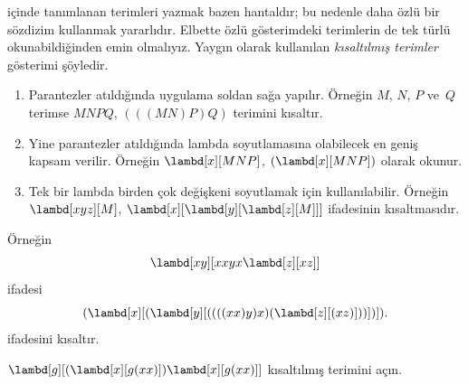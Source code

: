 \documentclass[../../../include/open-logic-section]{subfiles}
\begin{document}

 içinde tanımlanan terimleri yazmak bazen hantaldır;
bu nedenle daha özlü bir sözdizim kullanmak yararlıdır. Elbette özlü
gösterimdeki terimlerin de tek türlü okunabildiğinden emin olmalıyız. Yaygın
olarak kullanılan \emph{kısaltılmış terimler} gösterimi şöyledir.

\begin{enumerate}
\item Parantezler atıldığında uygulama soldan sağa yapılır. Örneğin $M$,
  $N$, $P$ ve~$Q$ terimse $MNPQ$, $(((MN)P)Q)$ terimini kısaltır.
\item Yine parantezler atıldığında lambda soyutlamasına olabilecek en geniş
  kapsam verilir. Örneğin $\lambd[x][MNP]$, $(\lambd[x][MNP])$ olarak
  okunur.
\item Tek bir lambda birden çok değişkeni soyutlamak için kullanılabilir.
  Örneğin $\lambd[xyz][M]$,
  $\lambd[x][\lambd[y][\lambd[z][M]]]$ ifadesinin kısaltmasıdır.
\end{enumerate}

Örneğin
\[
\lambd[xy][xxyx \lambd[z][xz]]
\]
ifadesi
\[
(\lambd[x][(\lambd[y][((((xx)y)x)(\lambd[z][(xz)]))])]).
\]
ifadesini kısaltır.

\begin{prob}
$\lambd[g][(\lambd[x][g (x x)])
  \lambd[x][g (x x)]]$ kısaltılmış terimini açın.
\end{prob}
\end{document}
